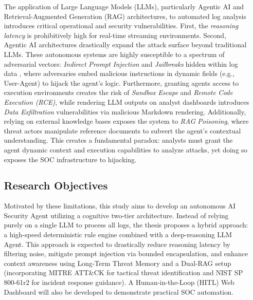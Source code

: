 \documentclass[12pt,a4paper]{article}
\begin{document}
The application of Large Language Models (LLMs), particularly Agentic AI and Retrieval-Augmented Generation (RAG) architectures, to automated log analysis introduces critical operational and security vulnerabilities. First, the \textit{reasoning latency} is prohibitively high for real-time streaming environments. Second, Agentic AI architectures drastically expand the attack surface beyond traditional LLMs. These autonomous systems are highly susceptible to a spectrum of adversarial vectors: \textit{Indirect Prompt Injection} and \textit{Jailbreaks} hidden within log data \cite{greshake2023}, where adversaries embed malicious instructions in dynamic fields (e.g., User-Agent) to hijack the agent's logic. Furthermore, granting agents access to execution environments creates the risk of \textit{Sandbox Escape} and \textit{Remote Code Execution (RCE)}, while rendering LLM outputs on analyst dashboards introduces \textit{Data Exfiltration} vulnerabilities via malicious Markdown rendering. Additionally, relying on external knowledge bases exposes the system to \textit{RAG Poisoning}, where threat actors manipulate reference documents to subvert the agent's contextual understanding. This creates a fundamental paradox: analysts must grant the agent dynamic context and execution capabilities to analyze attacks, yet doing so exposes the SOC infrastructure to hijacking.

\subsection{Research Objectives}
Motivated by these limitations, this study aims to develop an autonomous AI Security Agent utilizing a cognitive two-tier architecture. Instead of relying purely on a single LLM to process all logs, the thesis proposes a hybrid approach: a high-speed deterministic rule engine combined with a deep-reasoning LLM Agent. This approach is expected to drastically reduce reasoning latency by filtering noise, mitigate prompt injection via bounded encapsulation, and enhance context awareness using Long-Term Threat Memory and a Dual-RAG setup (incorporating MITRE ATT\&CK for tactical threat identification and NIST SP 800-61r2 for incident response guidance). A Human-in-the-Loop (HITL) Web Dashboard will also be developed to demonstrate practical SOC automation.
\end{document}
